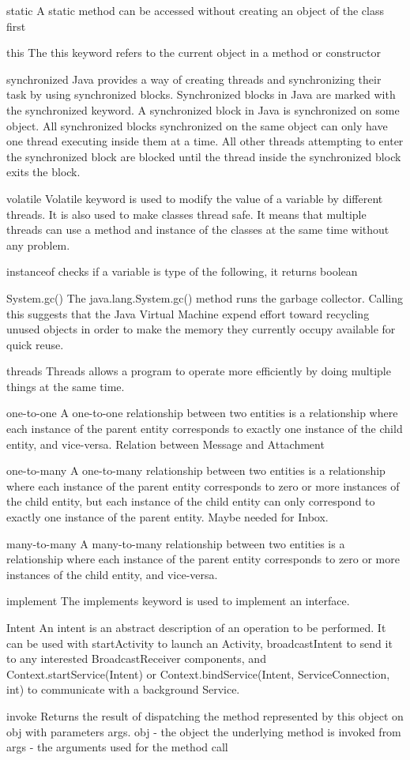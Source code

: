 \documentclass[a4paper,12pt]{article}
\begin{document}
static
A static method can be accessed without creating an object of the class first

this
The this keyword refers to the current object in a method or constructor

synchronized
Java provides a way of creating threads and synchronizing their task by using synchronized blocks. Synchronized blocks in Java are marked with the synchronized keyword. 
A synchronized block in Java is synchronized on some object. 
All synchronized blocks synchronized on the same object can only have one thread executing inside them at a time.
All other threads attempting to enter the synchronized block are blocked until the thread inside the synchronized block exits the block.

volatile
Volatile keyword is used to modify the value of a variable by different threads. It is also used to make classes thread safe. 
It means that multiple threads can use a method and instance of the classes at the same time without any problem.

instanceof
checks if a variable is type of the following, it returns boolean

System.gc()
The java.lang.System.gc() method runs the garbage collector. 
Calling this suggests that the Java Virtual Machine expend effort 
toward recycling unused objects in order to make the memory they currently occupy available for quick reuse.

threads
Threads allows a program to operate more efficiently by doing multiple things at the same time.

one-to-one 
A one-to-one relationship between two entities is a relationship where each instance of the parent entity corresponds to exactly one instance of the child entity, and vice-versa.
Relation between Message and Attachment


one-to-many
A one-to-many relationship between two entities is a relationship where each instance of the parent entity corresponds to zero or more instances of the child entity, 
but each instance of the child entity can only correspond to exactly one instance of the parent entity.
Maybe needed for Inbox. 


many-to-many
A many-to-many relationship between two entities is a relationship where each instance of the parent entity corresponds to zero or more instances of the child entity, and vice-versa.

implement
The implements keyword is used to implement an interface.

Intent
An intent is an abstract description of an operation to be performed. It can be used with startActivity to launch an Activity, broadcastIntent to send it to any interested BroadcastReceiver components, and Context.startService(Intent) or Context.bindService(Intent, ServiceConnection, int) to communicate with a background Service.

invoke
Returns the result of dispatching the method represented by this object on obj with parameters args.
obj - the object the underlying method is invoked from
args - the arguments used for the method call
\end{document}

